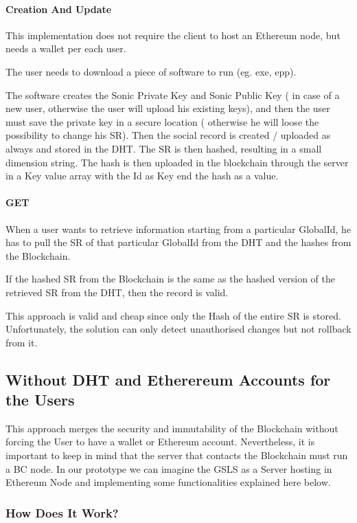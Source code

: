 \paragraph{Creation And Update}

This implementation does not require the client to host an Ethereum node, but needs a wallet per each user.

The user needs to download a piece of software to run (eg. exe, epp).

The software creates the Sonic Private Key and Sonic Public Key ( in case of a new user, otherwise the user will upload his existing keys), and then the user must save the private key in a secure location ( otherwise he will loose the possibility to change his SR).
Then the social record is created / uploaded as always and stored in the DHT.
The SR is then hashed, resulting in a small dimension string.
The hash is then uploaded in the blockchain through the server in a Key value array with the Id as Key end the hash as a value.

\paragraph{GET}

When a user wants to retrieve information starting from a particular GlobalId, he has to pull the SR of that particular GlobalId from the DHT and the hashes from the Blockchain.

If the hashed SR from the Blockchain is the same as the hashed version of the retrieved SR from the DHT, then the record is valid.

This approach is valid and cheap since only the Hash of the entire SR is stored.
Unfortunately, the solution can only detect unauthorised changes but not rollback from it.

\subsection{Without DHT and Etherereum Accounts for the Users}
This approach merges the security and immutability of the Blockchain without forcing the User to have a wallet or Ethereum account. Nevertheless, it is important to keep in mind that the server that contacts the Blockchain must run a BC node. In our prototype we can imagine the GSLS as a Server hosting in Ethereum Node and implementing some functionalities explained here below.

\subsubsection{How Does It Work?}

